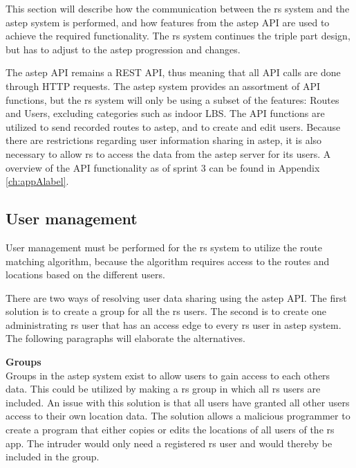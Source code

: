 This section will describe how the communication between the \gls{rs} system and the \gls{astep} system is performed, and how features from the \gls{astep} API are used to achieve the required functionality.
The \gls{rs} system continues the triple part design, but has to adjust to the \gls{astep} progression and changes.

The \gls{astep} API remains a REST API, thus meaning that all API calls are done through HTTP requests.
The \gls{astep} system provides an assortment of API functions, but the \gls{rs} system will only be using a subset of the features: Routes and Users, excluding categories such as indoor LBS.
The API functions are utilized to send recorded routes to \gls{astep}, and to create and edit users.
Because there are restrictions regarding user information sharing in \gls{astep}, it is also necessary to allow \gls{rs} to access the data from the \gls{astep} server for its users.
A overview of the API functionality as of sprint 3 can be found in Appendix \ref{ch:appAlabel}. 

\subsection{User management}
User management must be performed for the \gls{rs} system to utilize the route matching algorithm, because the algorithm requires access to the routes and locations based on the different users.

There are two ways of resolving user data sharing using the \gls{astep} API.
The first solution is to create a group for all the \gls{rs} users.
The second is to create one administrating \gls{rs} user that has an access edge to every \gls{rs} user in \gls{astep} system.
The following paragraphs will elaborate the alternatives.

\textbf{Groups}\\ 
Groups in the \gls{astep} system exist to allow users to gain access to each others data.
This could be utilized by making a \gls{rs} group in which all \gls{rs} users are included.
An issue with this solution is that all users have granted all other users access to their own location data. 
The solution allows a malicious programmer to create a program that either copies or edits the locations of all users of the \gls{rs} app.
The intruder would only need a registered \gls{rs} user and would thereby be included in the group.

